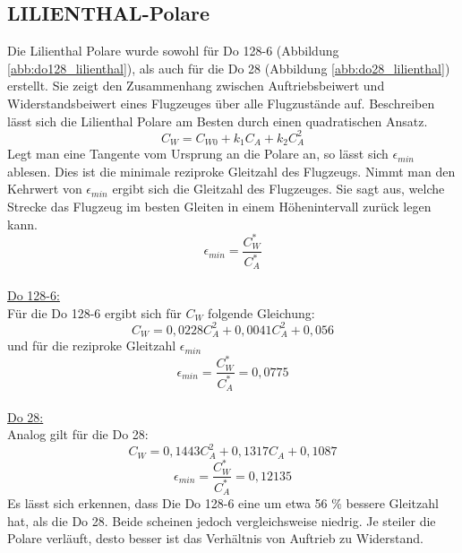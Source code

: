 \subsection{LILIENTHAL-Polare}
Die Lilienthal Polare wurde sowohl für Do 128-6 (Abbildung \ref{abb:do128_lilienthal}), als auch für die Do 28 (Abbildung \ref{abb:do28_lilienthal}) erstellt. Sie zeigt den Zusammenhang zwischen Auftriebsbeiwert und Widerstandsbeiwert eines Flugzeuges über alle Flugzustände auf. 
Beschreiben lässt sich die Lilienthal Polare am Besten durch einen quadratischen Ansatz.
\begin{equation}  \label{eq:theorie_cw}
C_W = C_{W0} + k_1 C_A + k_2 C_A^2
\end{equation}
Legt man eine Tangente vom Ursprung an die Polare an, so lässt sich $\epsilon_{min}$ ablesen. Dies ist die minimale reziproke Gleitzahl des Flugzeugs. Nimmt man den Kehrwert von $\epsilon_{min}$ ergibt sich die Gleitzahl des Flugzeuges. Sie sagt aus, welche Strecke das Flugzeug im besten Gleiten in einem Höhenintervall zurück legen kann. 
\begin{equation}
\epsilon_{min}=\frac{C_W^*}{C_A^*}
\end{equation} \\
\underline{Do 128-6:} \\
Für die Do 128-6 ergibt sich für $C_W$ folgende Gleichung:
\begin{equation}
C_W=0,0228 C_A^2 + 0,0041 C_A^2+ 0,056
\end{equation}
und für die reziproke Gleitzahl $\epsilon_{min}$
\begin{equation}
\epsilon_{min}=\frac{C_W^*}{C_A^*}=0,0775
\end{equation}
 \\
\underline{Do 28:} \\
Analog gilt für die Do 28:
\begin{equation}
C_W=0,1443C_{A}^2+0,1317C_A+0,1087
\end{equation}
\begin{equation}
\epsilon_{min}=\frac{C_W^*}{C_A^*}=0,12135
\end{equation}
Es lässt sich erkennen, dass Die Do 128-6 eine um etwa 56 \% bessere Gleitzahl hat, als die Do 28. Beide scheinen jedoch vergleichsweise niedrig. 
Je steiler die Polare verläuft, desto besser ist das Verhältnis von Auftrieb zu Widerstand.
\\\\
